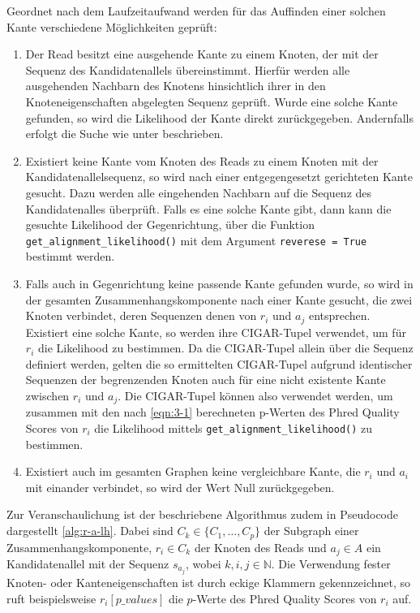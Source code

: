 Geordnet nach dem Laufzeitaufwand werden für das Auffinden einer solchen Kante verschiedene Möglichkeiten geprüft:
\begin{enumerate}
	\item \label{-1-} Der Read besitzt eine ausgehende Kante zu einem Knoten, der mit der Sequenz des Kandidatenallels übereinstimmt. Hierfür werden alle ausgehenden Nachbarn des Knotens hinsichtlich ihrer in den Knoteneigenschaften abgelegten Sequenz geprüft. Wurde eine solche Kante gefunden, so wird die Likelihood der Kante direkt zurückgegeben. Andernfalls erfolgt die Suche wie unter beschrieben. 
	\item \label{-2-} Existiert keine Kante vom Knoten des Reads zu einem Knoten mit der Kandidatenallelsequenz, so wird nach einer entgegengesetzt gerichteten Kante gesucht. Dazu werden alle eingehenden Nachbarn auf die Sequenz des Kandidatenalles überprüft. Falls es eine solche Kante gibt, dann kann die gesuchte Likelihood der Gegenrichtung, über die Funktion \lstinline|get_alignment_likelihood()| mit dem Argument \lstinline|reverese = True| bestimmt werden.
	\item \label{-3-} Falls auch in Gegenrichtung keine passende Kante gefunden wurde, so wird in der gesamten Zusammenhangskomponente nach einer Kante gesucht, die zwei Knoten verbindet, deren Sequenzen denen von $ r_{i} $ und $ a_{j} $ entsprechen. Existiert eine solche Kante, so werden ihre CIGAR-Tupel verwendet, um für $ r_{i} $ die Likelihood zu bestimmen. Da die CIGAR-Tupel allein über die Sequenz definiert werden, gelten die so ermittelten CIGAR-Tupel aufgrund identischer Sequenzen der begrenzenden Knoten auch für eine nicht existente Kante zwischen $ r_{i} $ und $ a_{j} $. Die CIGAR-Tupel können also verwendet werden, um zusammen mit den nach  \eqref{eqn:3-1} berechneten p-Werten des Phred Quality Scores  von $ r_{i} $ die Likelihood mittels \lstinline|get_alignment_likelihood()| zu bestimmen.
	\item \label{-4-} Existiert auch im gesamten Graphen keine vergleichbare Kante, die $ r_{i} $ und $ a_{i} $ mit einander verbindet, so wird der Wert Null zurückgegeben.
\end{enumerate}

Zur Veranschaulichung ist der beschriebene Algorithmus zudem in Pseudocode dargestellt \ref{alg:r-a-lh}. Dabei sind $ C_{k} \in \{C_{1}, \dots ,C_{p}\} $ der Subgraph einer Zusammenhangskomponente, $ r_{i} \in C_{k} $ der Knoten des Reads und $ a_{j} \in A $ ein Kandidatenallel mit der Sequenz $ s_{a_{j}} $, wobei $ k,i,j \in \mathds{N} $. Die Verwendung fester Knoten- oder Kanteneigenschaften ist durch eckige Klammern gekennzeichnet, so ruft beispielsweise $r_{i}[p\_values]$ die $ p $-Werte des Phred Quality Scores von $r_{i}$ auf.\\

